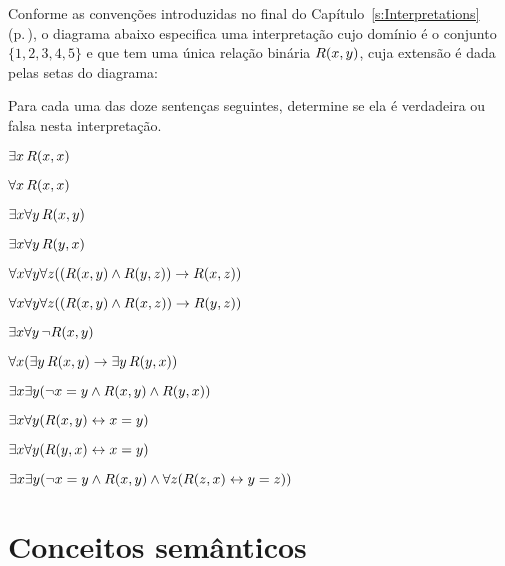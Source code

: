 \problempart
\label{pr.TorF3}
Conforme as convenções introduzidas no final do Capítulo~\ref{s:Interpretations} (p.\,\pageref{s:Interpret}), o diagrama abaixo especifica uma interpretação cujo domínio é o conjunto $\{1,2,3,4,5\}$ e que tem uma única relação binária $\mathord{R}(x,y)$, cuja extensão é dada pelas setas do diagrama:
\begin{center}
\end{center}
Para cada uma das doze sentenças seguintes, determine se ela é verdadeira ou falsa nesta interpretação.
\begin{earg}
\item $\exists x\, \mathord{R}(x,x)$
\item $\forall x\, \mathord{R}(x,x)$
\item $\exists x \forall y\, \mathord{R}(x,y)$
\item $\exists x \forall y\, \mathord{R}(y,x)$
\item $\forall x \forall y \forall z ((\mathord{R}(x,y) \wedge \mathord{R}(y,z)) \rightarrow \mathord{R}(x,z))$
\item $\forall x \forall y \forall z ((\mathord{R}(x,y) \wedge \mathord{R}(x,z)) \rightarrow \mathord{R}(y,z))$
\item $\exists x \forall y\, \neg \mathord{R}(x,y)$
\item $\forall x(\exists y\, \mathord{R}(x,y) \rightarrow \exists y\, \mathord{R}(y,x))$
\item $\exists x \exists y (\neg x = y \wedge \mathord{R}(x,y) \wedge \mathord{R}(y,x))$
\item $\exists x \forall y(\mathord{R}(x,y) \leftrightarrow x = y)$
\item $\exists x \forall y(\mathord{R}(y,x) \leftrightarrow x = y)$
\item $\exists x \exists y(\neg x = y \wedge \mathord{R}(x,y) \wedge \forall z(\mathord{R}(z,x) \leftrightarrow y = z))$
\end{earg}


\chapter{Conceitos semânticos}

